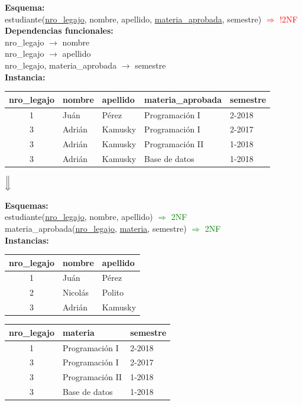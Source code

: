 \documentclass[preview]{standalone}
\begin{document}
\textbf{Esquema:}\\
estudiante(\underline{nro\_legajo}, nombre, apellido, \underline{materia\_aprobada}, semestre) \textcolor{red}{$\Rightarrow$ !2NF}\\

\textbf{Dependencias funcionales:}\\
nro\_legajo $\rightarrow$ nombre\\ 
nro\_legajo $\rightarrow$ apellido\\ 
nro\_legajo, materia\_aprobada $\rightarrow$ semestre \\

\textbf{Instancia:}
\begin{center}
\begin{tabular}{| c | l | l | l | l |}\hline			
	nro\_legajo & nombre & apellido & materia\_aprobada & semestre  \\\hline			
	1 & Ju\'an & P\'erez & Programaci\'on I & 2-2018 \\
	3 & Adri\'an & Kamusky & Programaci\'on I & 2-2017\\
	3 & Adri\'an & Kamusky & Programaci\'on II & 1-2018\\
	3 & Adri\'an & Kamusky & Base de datos & 1-2018\\\hline
\end{tabular}
\end{center}


\begin{center}
$\Big\Downarrow$
\end{center}
\textbf{Esquemas:}\\
estudiante(\underline{nro\_legajo}, nombre, apellido) \textcolor{green}{$\Rightarrow$ 2NF}\\
materia\_aprobada(\underline{nro\_legajo}, \underline{materia}, semestre) \textcolor{green}{$\Rightarrow$ 2NF}\\


\textbf{Instancias:}
\begin{center}
\begin{tabular}{| c | l | l |}\hline			
	nro\_legajo & nombre & apellido \\\hline			
	1 & Ju\'an & P\'erez \\
	2 & Nicol\'as & Polito \\
	3 & Adri\'an & Kamusky \\\hline
\end{tabular}
\quad
\begin{tabular}{| c | l | l |}\hline			
	nro\_legajo & materia & semestre\\\hline			
	1 & {\scriptsize{Programaci\'on I}} & 2-2018\\
	3 & {\scriptsize{Programaci\'on I}} & 2-2017 \\
	3 & {\scriptsize{Programaci\'on II}} & 1-2018 \\
	3 & {\scriptsize{Base de datos}} & 1-2018 \\\hline
\end{tabular}
\end{center}
\end{document}
